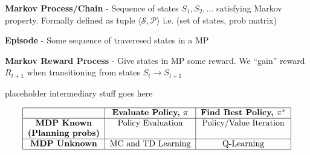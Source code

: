 \documentclass[a4paper,10pt]{article}
\begin{document}
\begin{multicols*}{2}
\begin{tcolorbox}[title={Reinforcement Learning}, module]
    \textbf{Markov Process/Chain} - Sequence of states $S_1, S_2, \ldots$ satisfying Markov property. Formally defined as tuple $\langle \mathcal{S}, \mathcal{P} \rangle$ i.e. (set of states, prob matrix)

    \textbf{Episode} - Some sequence of traveresed states in a MP

    \textbf{Markov Reward Process} - Give states in MP some reward. We ``gain'' reward $R_{t + 1}$ when transitioning from states $S_t \to S_{t + 1}$

    placeholder intermediary stuff goes here

    \[
        \begin{tabular}{|c|c|c|}
            \hline
            & \textbf{Evaluate Policy, $\pi$} & \textbf{Find Best Policy, $\pi^*$} \\
            \hline
            \textbf{MDP Known} & Policy Evaluation & Policy/Value Iteration \\
            \textbf{(Planning probs)} && \\
            \hline
            \textbf{MDP Unknown} & MC and TD Learning & Q-Learning \\
            \hline
        \end{tabular}
    \]

\end{tcolorbox}

\end{multicols*}
\end{document}
